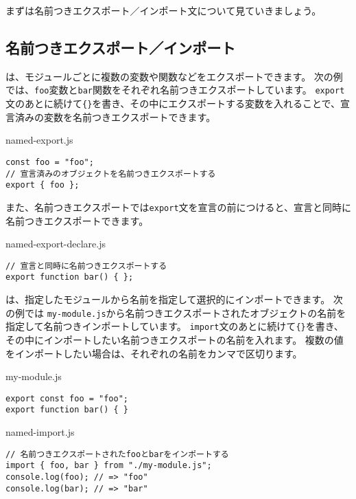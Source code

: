 まずは名前つきエクスポート／インポート文について見ていきましょう。

\hypertarget{named-export-import}{%
\subsection{名前つきエクスポート／インポート}\label{named-export-import}}

\textbf{}は、モジュールごとに複数の変数や関数などをエクスポートできます。
次の例では、\texttt{foo}変数と\texttt{bar}関数をそれぞれ名前つきエクスポートしています。
\texttt{export}文のあとに続けて\texttt{\{\}}を書き、その中にエクスポートする変数を入れることで、宣言済みの変数を名前つきエクスポートできます。

\begin{listtitle}
named-export.js
\end{listtitle}
\begin{lstlisting}
const foo = "foo";
// 宣言済みのオブジェクトを名前つきエクスポートする
export { foo };
\end{lstlisting}
\listend

また、名前つきエクスポートでは\texttt{export}文を宣言の前につけると、宣言と同時に名前つきエクスポートできます。

\begin{listtitle}
named-export-declare.js
\end{listtitle}
\begin{lstlisting}
// 宣言と同時に名前つきエクスポートする
export function bar() { };
\end{lstlisting}
\listend

\textbf{}は、指定したモジュールから名前を指定して選択的にインポートできます。
次の例では
\texttt{my-module.js}から名前つきエクスポートされたオブジェクトの名前を指定して名前つきインポートしています。
\texttt{import}文のあとに続けて\texttt{\{\}}を書き、その中にインポートしたい名前つきエクスポートの名前を入れます。
複数の値をインポートしたい場合は、それぞれの名前をカンマで区切ります。

\begin{listtitle}
my-module.js
\end{listtitle}
\begin{lstlisting}
export const foo = "foo";
export function bar() { }
\end{lstlisting}
\listend

\begin{listtitle}
named-import.js
\end{listtitle}
\begin{lstlisting}
// 名前つきエクスポートされたfooとbarをインポートする
import { foo, bar } from "./my-module.js";
console.log(foo); // => "foo"
console.log(bar); // => "bar"
\end{lstlisting}
\listend


